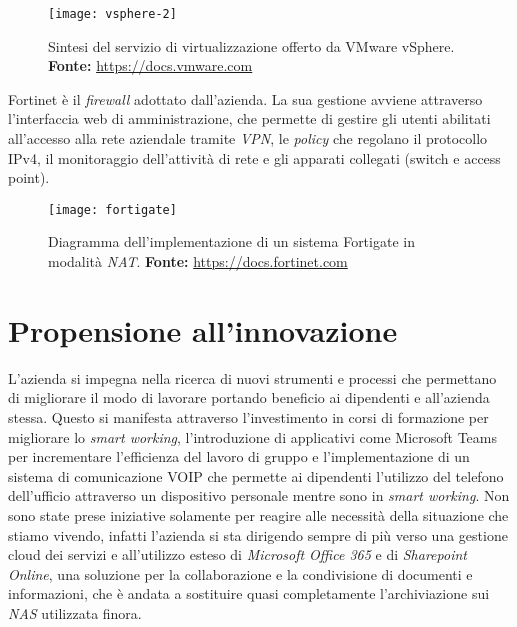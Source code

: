 \begin{figure}[htbp]
	\begin{center}
		\texttt{[image: vsphere-2]}
		\caption{Sintesi del servizio di virtualizzazione offerto da VMware vSphere. \newline \textbf{Fonte: } \url{https://docs.vmware.com}}
	\end{center}
\end{figure}


Fortinet è il \textit{firewall} adottato dall'azienda. La sua gestione avviene attraverso l'interfaccia web di amministrazione, che permette di gestire gli utenti abilitati all'accesso alla rete aziendale tramite \textit{VPN}, le \textit{policy} che regolano il protocollo IPv4, il monitoraggio dell'attività di rete e gli apparati collegati (switch e access point).

\vspace{10pt}
\begin{figure}[htbp]
	\begin{center}
		\texttt{[image: fortigate]}
		\caption{Diagramma dell'implementazione di un sistema Fortigate in modalità \textit{NAT}. \newline \textbf{Fonte: } \url{https://docs.fortinet.com}}
	\end{center}
\end{figure}
\vspace{10pt}


\section{Propensione all'innovazione}

L'azienda si impegna nella ricerca di nuovi strumenti e processi che permettano di migliorare il modo di lavorare portando beneficio ai dipendenti e all'azienda stessa.
Questo si manifesta attraverso l'investimento in corsi di formazione per migliorare lo \textit{smart working}, l'introduzione di applicativi come Microsoft Teams per incrementare l'efficienza del lavoro di gruppo e l'implementazione di un sistema di comunicazione VOIP che permette ai dipendenti l'utilizzo del telefono dell'ufficio attraverso un dispositivo personale mentre sono in \textit{smart working}. 
Non sono state prese iniziative solamente per reagire alle necessità della situazione che stiamo vivendo, infatti l'azienda si sta dirigendo sempre di più verso una gestione cloud dei servizi e all'utilizzo esteso di \textit{Microsoft Office 365} e di \textit{Sharepoint Online}, una soluzione per la collaborazione e la condivisione di documenti e informazioni, che è andata a sostituire quasi completamente l'archiviazione sui \textit{NAS} utilizzata finora.


